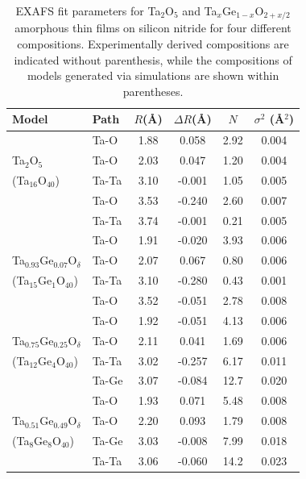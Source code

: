 \begin{table}[ht]
\centering
\setlength{\tabcolsep}{5pt}
\begin{tabular}{llcccc}
\hline\hline
Model & Path & $R$(\AA) 
& $\Delta R$(\AA) & $N$ & $\sigma^{2}$ (\AA$^{2}$) \\
\hline
{} & Ta-O  			   	   & 1.88  & { }0.058 & 2.92 & 0.004 \\ 
Ta$_{2}$O$_{5}$	   & Ta-O  & 2.03  & { }0.047 & 1.20 & 0.004 \\ 
(Ta$_{16}$O$_{40}$)& Ta-Ta & 3.10  &   -0.001 & 1.05 & 0.005 \\
{} & Ta-O  			   	   & 3.53  &   -0.240 & 2.60 & 0.007 \\
{} & Ta-Ta 			   	   & 3.74  &   -0.001 & 0.21 & 0.005 \\
\hline
{}								   & Ta-O  & 1.91 &   -0.020 & 3.93 & 0.006 \\ 
Ta$_{0.93}$Ge$_{0.07}$O$_{\delta}$ & Ta-O  & 2.07 & { }0.067 & 0.80 & 0.006 \\
(Ta$_{15}$Ge$_{1}$O$_{40}$)		   & Ta-Ta & 3.10 &   -0.280 & 0.43 & 0.001 \\
{} 								   & Ta-O  & 3.52 &   -0.051 & 2.78 & 0.008 \\
\hline 
{}& Ta-O  									& 1.92 &   -0.051 & 4.13 & 0.006  \\ 
Ta$_{0.75}$Ge$_{0.25}$O$_{\delta}$	& Ta-O  & 2.11 & { }0.041 & 1.69 & 0.006  \\
(Ta$_{12}$Ge$_{4}$O$_{40}$) 		& Ta-Ta & 3.02 &   -0.257 & 6.17 & 0.011  \\
{}& Ta-Ge 									& 3.07 &   -0.084 & 12.7 & 0.020  \\
\hline 
{} & Ta-O   							 	& 1.93 & { }0.071 & 5.48 & 0.008 \\ 
Ta$_{0.51}$Ge$_{0.49}$O$_{\delta}$ & Ta-O   & 2.20 & { }0.093 & 1.79 & 0.008 \\
(Ta$_{8}$Ge$_{8}$O$_{40}$)		   & Ta-Ge  & 3.03 &   -0.008 & 7.99 & 0.018 \\
{} & Ta-Ta  							 	& 3.06 &   -0.060 & 14.2 & 0.023 \\
\hline 
\end{tabular}
\caption{EXAFS fit parameters for Ta$_{2}$O$_{5}$ and Ta$_{x}$Ge$_{1-x}$O$_{2+x/2}$ amorphous thin films on silicon nitride for four different compositions. Experimentally derived compositions are indicated without parenthesis, while the compositions of models generated via simulations are shown within parentheses.}
\label{table:exafs2}
\end{table}


